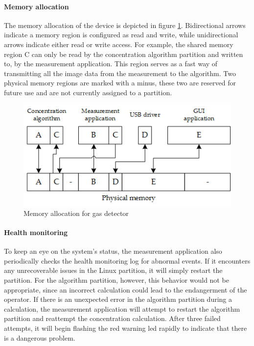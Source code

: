 \paragraph{Memory allocation}
The memory allocation of the device is depicted in figure \ref{fig:gas_detect_memory_allocation}. Bidirectional arrows indicate a memory region is configured as read and write, while unidirectional arrows indicate either read or write access. For example, the shared memory region C can only be read by the concentration algorithm partition and written to, by the measurement application. This region serves as a fast way of transmitting all the image data from the measurement to the algorithm. Two physical memory regions are marked with a minus, these two are reserved for future use and are not currently assigned to a partition.

\begin{figure}[hb!]
\centering
\includegraphics[scale=0.9 ]{Figures/gas_detect_memory_allocation.png}
\decoRule
\caption{Memory allocation for gas detector}
\label{fig:gas_detect_memory_allocation}
\end{figure}

\paragraph{Health monitoring}
To keep an eye on the system's status, the measurement application also periodically checks the health monitoring log for abnormal events. If it encounters any unrecoverable issues in the Linux partition, it will simply restart the partition. 
For the algorithm partition, however, this behavior would not be appropriate, since an incorrect calculation could lead to the endangerment of the operator. If there is an unexpected error in the algorithm partition during a calculation, the measurement application will attempt to restart the algorithm partition and reattempt the concentration calculation. After three failed attempts, it will begin flashing the red warning \acrshort{led} rapidly to indicate that there is a dangerous problem.

